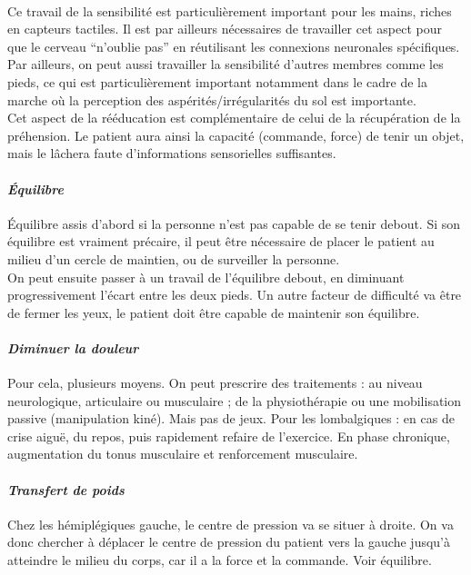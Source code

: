 \paragraph{} 
Ce travail de la sensibilité est particulièrement important pour les mains, riches en capteurs tactiles. Il est par ailleurs nécessaires de travailler cet aspect pour que le cerveau “n’oublie pas” en réutilisant les connexions neuronales spécifiques. Par ailleurs, on peut aussi travailler la sensibilité d’autres membres comme les pieds, ce qui est particulièrement important notamment dans le cadre de la marche où la perception des aspérités/irrégularités du sol est importante.\\
Cet aspect de la rééducation est complémentaire de celui de la récupération de la préhension. Le patient aura ainsi la capacité (commande, force) de tenir un objet, mais le lâchera faute d’informations sensorielles suffisantes.

	\paragraph{\emph{Équilibre} \\ }
Équilibre assis d’abord si la personne n’est pas capable de se tenir debout. Si son équilibre est vraiment précaire, il peut être nécessaire de placer le patient au milieu d’un cercle de maintien, ou de surveiller la personne.\\
On peut ensuite passer à un travail de l’équilibre debout, en diminuant progressivement l’écart entre les deux pieds. Un autre facteur de difficulté va être de fermer les yeux, le patient doit être capable de maintenir son équilibre.

	\paragraph{\emph{Diminuer la douleur} \\ }
Pour cela, plusieurs moyens. On peut prescrire des traitements : au niveau neurologique, articulaire ou musculaire ; de la physiothérapie ou une mobilisation passive (manipulation kiné). Mais pas de jeux.
Pour les lombalgiques : en cas de crise aiguë, du repos, puis rapidement refaire de l’exercice.
En phase chronique, augmentation du tonus musculaire et renforcement musculaire.

	\paragraph{\emph{Transfert de poids} \\ }
Chez les hémiplégiques gauche, le centre de pression va se situer à droite. On va donc chercher à déplacer le centre de pression du patient vers la gauche jusqu’à atteindre le milieu du corps, car il a la force et la commande. Voir équilibre.


